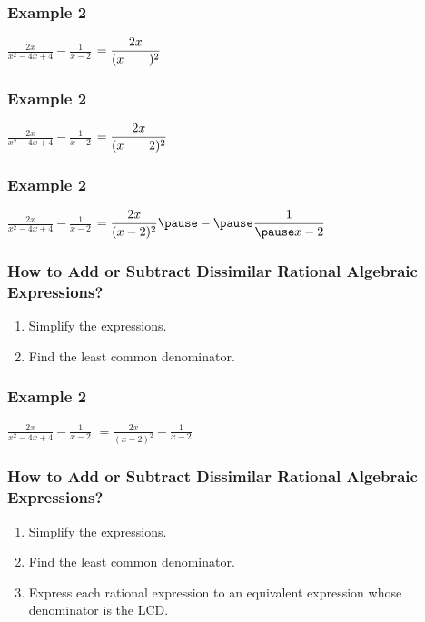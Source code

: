 \documentclass[14pt]{beamer}
\begin{document}
    \begin{frame}
    	\frametitle{Example 2}
    	$\displaystyle \frac{2x}{x^2-4x+4} - \frac{1}{x-2}$
    	$ = \displaystyle \frac{2x}{(x\text{\hspace{2em}})^2}$
    \end{frame}

    \begin{frame}
    	\frametitle{Example 2}
    	$\displaystyle \frac{2x}{x^2-4x+4} - \frac{1}{x-2}$
    	$ = \displaystyle \frac{2x}{(x\text{\hspace{2em}} 2)^2}$
    \end{frame}

    \begin{frame}
    	\frametitle{Example 2}
    	$\displaystyle \frac{2x}{x^2-4x+4} - \frac{1}{x-2}$
    	$ = \displaystyle \frac{2x}{(x - 2)^2} \pause - \pause \frac{1}{\pause x-2} $
    \end{frame}

   \begin{frame}
   	\frametitle{How to Add or Subtract Dissimilar Rational Algebraic Expressions?}
   	\begin{enumerate}
   		\item Simplify the expressions.
   		\item Find the least common denominator. 
   	\end{enumerate}
   \end{frame}

    \begin{frame}
    	\frametitle{Example 2}
    	$\displaystyle \frac{2x}{x^2-4x+4} - \frac{1}{x-2}$
    	$ = \displaystyle \frac{2x}{(x - 2)^2} - \frac{1}{x-2} $
    	
    \end{frame}

    \begin{frame}
    	\frametitle{How to Add or Subtract Dissimilar Rational Algebraic Expressions?}
    	\begin{enumerate}
    		\item Simplify the expressions.
    		\item Find the least common denominator. 
    		\item Express each rational expression to an equivalent expression whose denominator is the LCD.
    	\end{enumerate}
    \end{frame}
\end{document}
